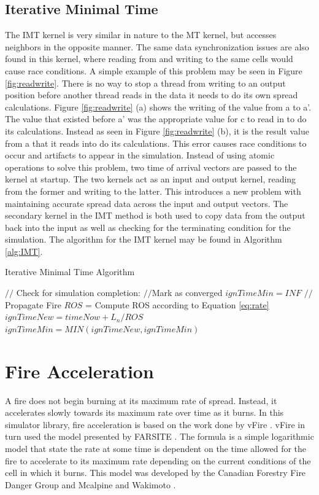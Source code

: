 \subsection{Iterative Minimal Time}
The IMT kernel is very similar in nature to the MT kernel, but accesses neighbors in the opposite manner. The same data synchronization issues are also found in this kernel, where reading from and writing to the same cells would cause race conditions. A simple example of this problem may be seen in Figure \ref{fig:readwrite}. There is no way to stop a thread from writing to an output position before another thread reads in the data it needs to do its own spread calculations. Figure \ref{fig:readwrite} (a) shows the writing of the value from a to a'. The value that existed before a' was the appropriate value for c to read in to do its calculations. Instead as seen in Figure \ref{fig:readwrite} (b), it is the result value from a that it reads into do its calculations. This error causes race conditions to occur and artifacts to appear in the simulation. Instead of using atomic operations to solve this problem, two time of arrival vectors are passed to the kernel at startup. The two kernels act as an input and output kernel, reading from the former and writing to the latter. This introduces a new problem with maintaining accurate spread data across the input and output vectors. The secondary kernel in the IMT method is both used to copy data from the output back into the input as well as checking for the terminating condition for the simulation. The algorithm for the IMT kernel may be found in Algorithm \ref{alg:IMT}.

\begin{algorithm}[H]
  \caption{Iterative Minimal Time Algorithm}
  \label{alg:IMT}
  \begin{algorithmic}
  \STATE $//$ Check for simulation completion:
  \STATE $//$Mark as converged
  \ENDIF
  \STATE $ignTimeMin = INF$
  \STATE $//$Propagate Fire
  \STATE $ROS$ = Compute ROS according to Equation \ref{eq:rate}
  \STATE $ignTimeNew = timeNow + L_n / ROS$
  \STATE $ignTimeMin = MIN(ignTimeNew, ignTimeMin)$
  \ENDFOR
  \ENDIF
  \ENDFOR
  \end{algorithmic}
\end{algorithm}

\section{Fire Acceleration}
A fire does not begin burning at its maximum rate of spread. Instead, it accelerates slowly towards its maximum rate over time as it burns. In this simulator library, fire acceleration is based on the work done by vFire \cite{vFire}. vFire in turn used the model presented by FARSITE \cite{FARSITE}. The formula is a simple logarithmic model that state the rate at some time is dependent on the time allowed for the fire to accelerate to its maximum rate depending on the current conditions of the cell in which it burns. This model was developed by the Canadian Forestry Fire Danger Group and Mcalpine and Wakimoto \cite{accel_canada,accel_mcalpine}. 

